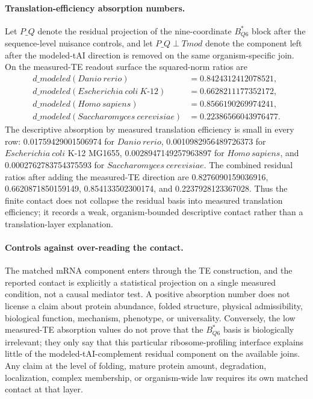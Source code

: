 \paragraph{Translation-efficiency absorption numbers.}
Let $P\_Q$ denote the residual projection of the nine-coordinate $B^{\ast}_{Q6}$ block after the sequence-level nuisance controls, and let $P\_{Q\perp Tmod}$ denote the component left after the modeled-tAI direction is removed on the same organism-specific join.  On the measured-TE readout surface the squared-norm ratios are
$$
\begin{aligned}
 d\_{modeled}(Danio\ rerio) &= 0.8424312412078521,\\
 d\_{modeled}(Escherichia\ coli\ K\text{-}12) &= 0.6628211177352172,\\
 d\_{modeled}(Homo\ sapiens) &= 0.8566190269974241,\\
 d\_{modeled}(Saccharomyces\ cerevisiae) &= 0.22386566043976477.
\end{aligned}
$$
The descriptive absorption by measured translation efficiency is small in every row: 0.01759429001506974 for $Danio\ rerio$, 0.0010982956489726373 for $Escherichia\ coli$ K-12 MG1655, 0.0028947149257963897 for $Homo\ sapiens$, and 0.0002762783754375593 for $Saccharomyces\ cerevisiae$.  The combined residual ratios after adding the measured-TE direction are 0.8276090159036916, 0.6620871850159149, 0.854133502300174, and 0.2237928123367028.  Thus the finite contact does not collapse the residual basis into measured translation efficiency; it records a weak, organism-bounded descriptive contact rather than a translation-layer explanation.

\paragraph{Controls against over-reading the contact.}
The matched mRNA component enters through the TE construction, and the reported contact is explicitly a statistical projection on a single measured condition, not a causal mediator test.  A positive absorption number does not license a claim about protein abundance, folded structure, physical admissibility, biological function, mechanism, phenotype, or universality.  Conversely, the low measured-TE absorption values do not prove that the $B^{\ast}_{Q6}$ basis is biologically irrelevant; they only say that this particular ribosome-profiling interface explains little of the modeled-tAI-complement residual component on the available joins.  Any claim at the level of folding, mature protein amount, degradation, localization, complex membership, or organism-wide law requires its own matched contact at that layer.

